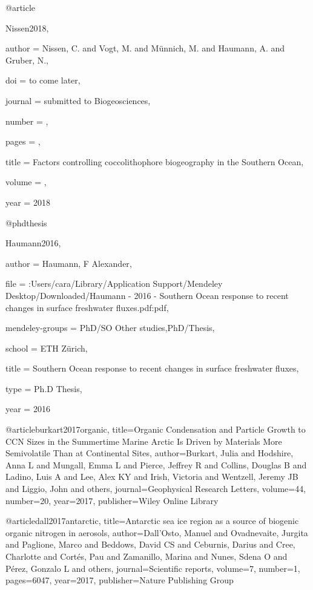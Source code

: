 @article{Nissen2018,

author = {Nissen, C. and Vogt, M. and M\"{u}nnich, M. and Haumann, A. and Gruber, N.},

doi = {to come later},

journal = {submitted to Biogeosciences},

number = {},

pages = {},

title = {{Factors controlling coccolithophore biogeography in the Southern Ocean}},

volume = {},

year = {2018}

}

@phdthesis{Haumann2016,

author = {Haumann, F Alexander},

file = {:Users/cara/Library/Application Support/Mendeley Desktop/Downloaded/Haumann - 2016 - Southern Ocean response to recent changes in surface freshwater fluxes.pdf:pdf},

mendeley-groups = {PhD/SO Other studies,PhD/Thesis},

school = {ETH Z{\"{u}}rich},

title = {{Southern Ocean response to recent changes in surface freshwater fluxes}},

type = {Ph.D Thesis},

year = {2016}

}

@article{burkart2017organic,
  title={Organic Condensation and Particle Growth to CCN Sizes in the Summertime Marine Arctic Is Driven by Materials More Semivolatile Than at Continental Sites},
  author={Burkart, Julia and Hodshire, Anna L and Mungall, Emma L and Pierce, Jeffrey R and Collins, Douglas B and Ladino, Luis A and Lee, Alex KY and Irish, Victoria and Wentzell, Jeremy JB and Liggio, John and others},
  journal={Geophysical Research Letters},
  volume={44},
  number={20},
  year={2017},
  publisher={Wiley Online Library}
}

@article{dall2017antarctic,
  title={Antarctic sea ice region as a source of biogenic organic nitrogen in aerosols},
  author={Dall'Osto, Manuel and Ovadnevaite, Jurgita and Paglione, Marco and Beddows, David CS and Ceburnis, Darius and Cree, Charlotte and Cort{\'e}s, Pau and Zamanillo, Marina and Nunes, Sdena O and P{\'e}rez, Gonzalo L and others},
  journal={Scientific reports},
  volume={7},
  number={1},
  pages={6047},
  year={2017},
  publisher={Nature Publishing Group}
}

